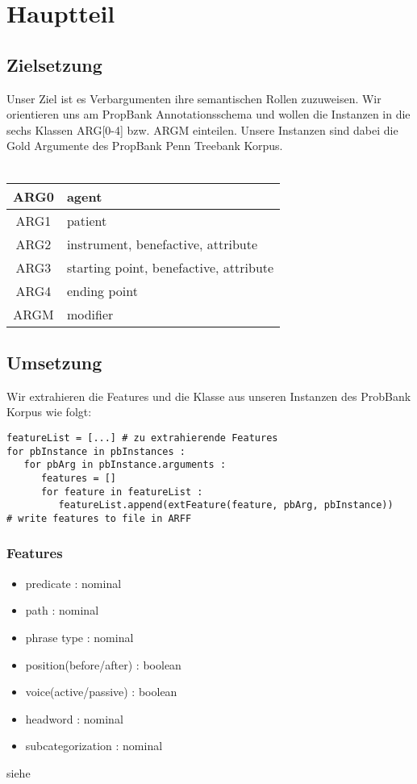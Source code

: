 \documentclass[runningheads]{llncs}
\begin{document}
\section{Hauptteil}
\subsection{Zielsetzung}

Unser Ziel ist es Verbargumenten ihre semantischen Rollen zuzuweisen. Wir orientieren uns am PropBank Annotationsschema und
wollen die Instanzen in die sechs Klassen ARG[0-4] bzw. ARGM einteilen. Unsere Instanzen sind dabei die Gold Argumente des PropBank Penn Treebank Korpus.\\
\\
\begin{table}
\centering
\begin{tabular}{|c|l|}
\hline 
ARG0 & agent \\ 
\hline 
ARG1 & patient \\ 
\hline 
ARG2 & instrument, benefactive, attribute \\ 
\hline 
ARG3 & starting point, benefactive, attribute \\ 
\hline 
ARG4 & ending point \\ 
\hline 
ARGM & modifier \\ 
\hline 
\end{tabular}
\end{table}
 
\subsection{Umsetzung}

Wir extrahieren die Features und die Klasse aus unseren Instanzen des ProbBank Korpus wie folgt:
\begin{lstlisting}[frame=lines]
featureList = [...] # zu extrahierende Features
for pbInstance in pbInstances :
   for pbArg in pbInstance.arguments :
      features = []
      for feature in featureList :
         featureList.append(extFeature(feature, pbArg, pbInstance))
# write features to file in ARFF
\end{lstlisting}

\subsubsection{Features}
\begin{itemize}
\item predicate : nominal
\item path : nominal
\item phrase type : nominal
\item position(before/after) : boolean
\item voice(active/passive) : boolean
\item headword : nominal
\item subcategorization : nominal
\end{itemize}
siehe \cite{svm}
\end{document}
